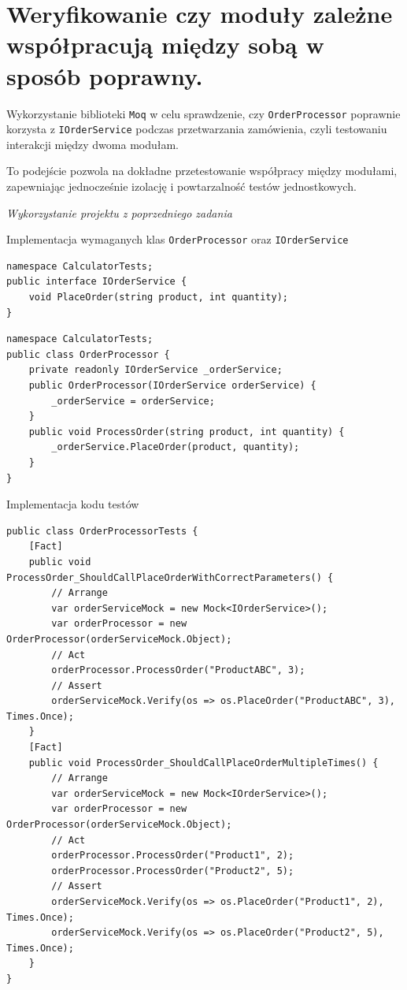 \documentclass[12pt]{article}
\begin{document}
\section{Weryfikowanie czy moduły zależne współpracują między sobą w sposób poprawny.}
\begin{description}
  \item Wykorzystanie biblioteki \texttt{Moq} w celu sprawdzenie, czy \texttt{OrderProcessor} poprawnie korzysta z \texttt{IOrderService} podczas przetwarzania zamówienia, czyli testowaniu interakcji między dwoma modułam.
  \item To podejście pozwola na dokładne przetestowanie współpracy między modułami, zapewniając jednocześnie izolację i powtarzalność testów jednostkowych.
  \item \textit{Wykorzystanie projektu z poprzedniego zadania}
\end{description}
\vspace*{\fill}
Implementacja wymaganych klas \texttt{OrderProcessor} oraz \texttt{IOrderService}
\begin{verbatim}
namespace CalculatorTests;
public interface IOrderService {
    void PlaceOrder(string product, int quantity);
}
\end{verbatim}
\begin{verbatim}
namespace CalculatorTests;
public class OrderProcessor {
    private readonly IOrderService _orderService;
    public OrderProcessor(IOrderService orderService) {
        _orderService = orderService;
    }
    public void ProcessOrder(string product, int quantity) {
        _orderService.PlaceOrder(product, quantity);
    }
}
\end{verbatim}
\vspace*{\fill}
\pagebreak
Implementacja kodu testów
\begin{verbatim}
public class OrderProcessorTests {
    [Fact]
    public void ProcessOrder_ShouldCallPlaceOrderWithCorrectParameters() {
        // Arrange
        var orderServiceMock = new Mock<IOrderService>();
        var orderProcessor = new OrderProcessor(orderServiceMock.Object);
        // Act
        orderProcessor.ProcessOrder("ProductABC", 3);
        // Assert
        orderServiceMock.Verify(os => os.PlaceOrder("ProductABC", 3), Times.Once);
    }
    [Fact]
    public void ProcessOrder_ShouldCallPlaceOrderMultipleTimes() {
        // Arrange
        var orderServiceMock = new Mock<IOrderService>();
        var orderProcessor = new OrderProcessor(orderServiceMock.Object);
        // Act
        orderProcessor.ProcessOrder("Product1", 2);
        orderProcessor.ProcessOrder("Product2", 5);
        // Assert
        orderServiceMock.Verify(os => os.PlaceOrder("Product1", 2), Times.Once);
        orderServiceMock.Verify(os => os.PlaceOrder("Product2", 5), Times.Once);
    }
}
\end{verbatim}
\end{document}
